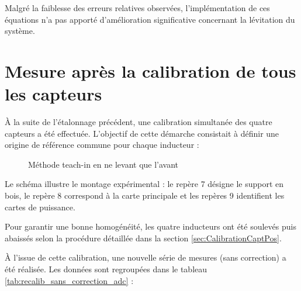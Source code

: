 Malgré la faiblesse des erreurs relatives observées, l'implémentation de ces équations n'a pas apporté d'amélioration significative concernant la lévitation du système.

\section{Mesure après la calibration de tous les capteurs}
À la suite de l'étalonnage précédent, une calibration simultanée des quatre capteurs a été effectuée. L'objectif de cette démarche consistait à définir une origine de référence commune pour chaque inducteur :

\begin{figure}[H]
    \centering
    
    \caption{Méthode teach-in en ne levant que l'avant}
    \label{fig:DessinMaquetteCote}
\end{figure}

Le schéma illustre le montage expérimental : le repère 7 désigne le support en bois, le repère 8 correspond à la carte principale et les repères 9 identifient les cartes de puissance.

Pour garantir une bonne homogénéité, les quatre inducteurs ont été soulevés puis abaissés selon la procédure détaillée dans la section \ref{sec:CalibrationCaptPos}.

À l'issue de cette calibration, une nouvelle série de mesures (sans correction) a été réalisée. Les données sont regroupées dans le tableau \ref{tab:recalib_sans_correction_adc} :

